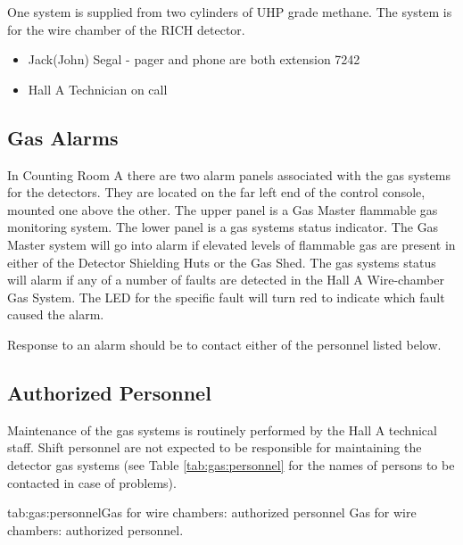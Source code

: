 One system is supplied from two cylinders of UHP grade methane.
The system is for the wire chamber of the RICH detector.


\begin{itemize} 
\item[~]Jack(John) Segal - pager and phone are both extension 7242
\item[~]Hall A Technician on call
\end{itemize} 

\begin{safetyen}{10}{15}
\section{Gas Alarms}
\end{safetyen}

In Counting Room A there are two alarm panels associated with the gas
systems for the detectors.  They are located on the far left end of the
control console, mounted one above the other.  The upper panel is a
Gas Master flammable gas monitoring system.  The lower panel is a gas
systems status indicator.  The Gas Master system will go into alarm if
elevated levels of flammable gas are present in either of the Detector
Shielding Huts or the Gas Shed.
The gas systems status will
alarm if any of a number of faults are detected in the Hall A Wire-chamber
Gas System.  The LED for the specific fault will turn red to indicate which
fault caused the alarm.

Response to an alarm should be to contact either of the personnel listed below.

\begin{safetyen}{10}{15}
\section{Authorized Personnel}
\end{safetyen}

Maintenance of the gas systems is routinely performed by the Hall A
technical staff.  Shift personnel are not expected to be responsible
for maintaining the detector gas systems (see Table \ref{tab:gas:personnel}  
for the names of persons to be contacted in case of problems). 

\begin{namestab}{tab:gas:personnel}{Gas for wire chambers: authorized personnel}{%
      Gas for wire chambers: authorized personnel.}
  \JackSegal{}
\end{namestab}

